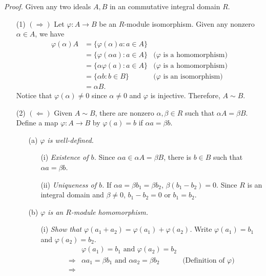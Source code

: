 \documentclass{article}
\begin{document}
\emph{Proof.}
Given any two ideals $A, B$ in an commutative integral domain $R$.
\begin{enumerate}
\item[(1)]
$(\Longrightarrow)$
Let $\varphi: A \to B$ be an $R$-module isomorphism.
Given any nonzero $\alpha \in A$, we have
\begin{align*}
\varphi(\alpha)A
&= \{ \varphi(\alpha)a : a \in A \} \\
&= \{ \varphi(\alpha a) : a \in A \}
  &\text{($\varphi$ is a homomorphism)} \\
&= \{ \alpha\varphi(a) : a \in A \}
  &\text{($\varphi$ is a homomorphism)} \\
&= \{ \alpha b : b \in B \}
  &\text{($\varphi$ is an isomorphism)} \\
&= \alpha B.
\end{align*}
Notice that $\varphi(\alpha) \neq 0$ since $\alpha \neq 0$ and $\varphi$ is injective.
Therefore, $A \sim B$.
\item[(2)]
$(\Longleftarrow)$
Given $A \sim B$, there are nonzero $\alpha, \beta \in R$ such that $\alpha A = \beta B$.
Define a map $\varphi: A \to B$ by $\varphi(a) = b$ if $\alpha a = \beta b$.
  \begin{enumerate}
  \item[(a)]
  \emph{$\varphi$ is well-defined.}
    \begin{enumerate}
    \item[(i)]
    \emph{Existence of $b$.}
    Since $\alpha a \in \alpha A = \beta B$, there is $b \in B$ such that $\alpha a = \beta b$.
    \item[(ii)]
    \emph{Uniqueness of $b$.}
    If $\alpha a = \beta b_1 = \beta b_2$, $\beta(b_1-b_2) = 0$.
    Since $R$ is an integral domain and $\beta \neq 0$, $b_1-b_2 = 0$ or $b_1 = b_2$.
    \end{enumerate}
  \item[(b)]
  \emph{$\varphi$ is an $R$-module homomorphism.}
    \begin{enumerate}
    \item[(i)]
    \emph{Show that $\varphi(a_1+a_2) = \varphi(a_1) + \varphi(a_2)$.}
    Write $\varphi(a_1) = b_1$ and $\varphi(a_2) = b_2$.
    \begin{align*}
    &\varphi(a_1) = b_1 \text{ and } \varphi(a_2) = b_2 \\
    \Longrightarrow&
    \alpha a_1 = \beta b_1 \text{ and } \alpha a_2 = \beta b_2
      &\text{(Definition of $\varphi$)} \\
    \Longrightarrow&

\end{align*}
\end{enumerate}
\end{enumerate}
\end{enumerate}
\end{document}
